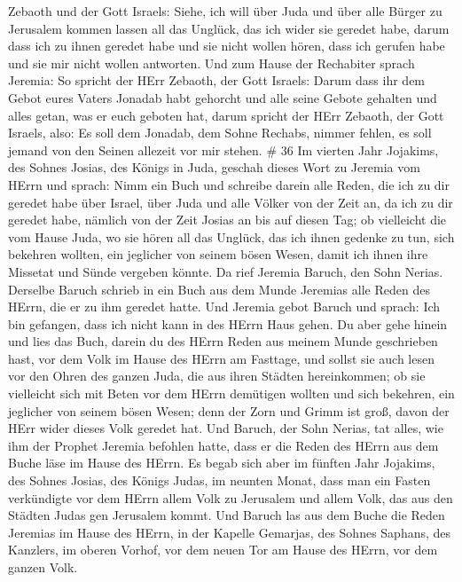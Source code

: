 Zebaoth und der Gott Israels: Siehe, ich will über Juda und über alle
Bürger zu Jerusalem kommen lassen all das Unglück, das ich wider sie
geredet habe, darum dass ich zu ihnen geredet habe und sie nicht wollen
hören, dass ich gerufen habe und sie mir nicht wollen antworten.
 Und zum Hause der Rechabiter sprach Jeremia: So spricht
der HErr Zebaoth, der Gott Israels: Darum dass ihr dem Gebot eures
Vaters Jonadab habt gehorcht und alle seine Gebote gehalten und alles
getan, was er euch geboten hat,  darum spricht der HErr
Zebaoth, der Gott Israels, also: Es soll dem Jonadab, dem Sohne Rechabs,
nimmer fehlen, es soll jemand von den Seinen allezeit vor mir stehen. \#
36  Im vierten Jahr Jojakims, des Sohnes Josias, des Königs
in Juda, geschah dieses Wort zu Jeremia vom HErrn und sprach:
 Nimm ein Buch und schreibe darein alle Reden, die ich zu
dir geredet habe über Israel, über Juda und alle Völker von der Zeit an,
da ich zu dir geredet habe, nämlich von der Zeit Josias an bis auf
diesen Tag;  ob vielleicht die vom Hause Juda, wo sie hören
all das Unglück, das ich ihnen gedenke zu tun, sich bekehren wollten,
ein jeglicher von seinem bösen Wesen, damit ich ihnen ihre Missetat und
Sünde vergeben könnte.  Da rief Jeremia Baruch, den Sohn
Nerias. Derselbe Baruch schrieb in ein Buch aus dem Munde Jeremias alle
Reden des HErrn, die er zu ihm geredet hatte.  Und Jeremia
gebot Baruch und sprach: Ich bin gefangen, dass ich nicht kann in des
HErrn Haus gehen.  Du aber gehe hinein und lies das Buch,
darein du des HErrn Reden aus meinem Munde geschrieben hast, vor dem
Volk im Hause des HErrn am Fasttage, und sollst sie auch lesen vor den
Ohren des ganzen Juda, die aus ihren Städten hereinkommen; 
ob sie vielleicht sich mit Beten vor dem HErrn demütigen wollten und
sich bekehren, ein jeglicher von seinem bösen Wesen; denn der Zorn und
Grimm ist groß, davon der HErr wider dieses Volk geredet hat.
 Und Baruch, der Sohn Nerias, tat alles, wie ihm der Prophet
Jeremia befohlen hatte, dass er die Reden des HErrn aus dem Buche läse
im Hause des HErrn.  Es begab sich aber im fünften Jahr
Jojakims, des Sohnes Josias, des Königs Judas, im neunten Monat, dass
man ein Fasten verkündigte vor dem HErrn allem Volk zu Jerusalem und
allem Volk, das aus den Städten Judas gen Jerusalem kommt. 
Und Baruch las aus dem Buche die Reden Jeremias im Hause des HErrn, in
der Kapelle Gemarjas, des Sohnes Saphans, des Kanzlers, im oberen
Vorhof, vor dem neuen Tor am Hause des HErrn, vor dem ganzen Volk.
